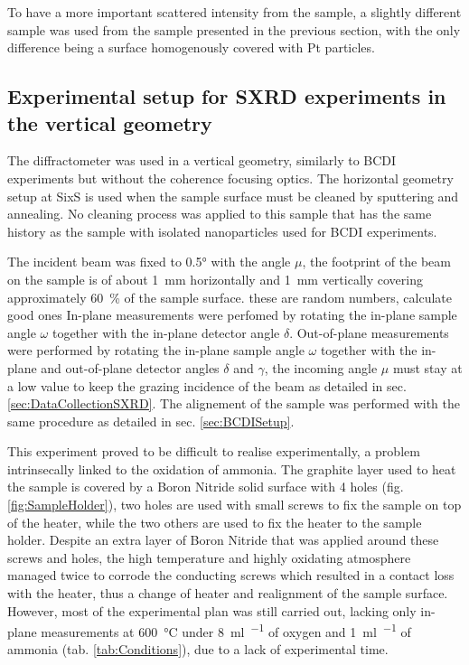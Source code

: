 To have a more important scattered intensity from the sample, a slightly different sample was used from the sample presented in the previous section, with the only difference being a surface homogenously covered with Pt particles.

\subsection{Experimental setup for SXRD experiments in the vertical geometry}\label{sec:SXRDSetupV}

The diffractometer was used in a vertical geometry, similarly to BCDI experiments but without the coherence focusing optics.
The horizontal geometry setup at SixS is used when the sample surface must be cleaned by sputtering and annealing.
No cleaning process was applied to this sample that has the same history as the sample with isolated nanoparticles used for BCDI experiments.

The incident beam was fixed to \ang{0.5} with the angle $\mu$, the footprint of the beam on the sample is of about \qty{1}{\mm} horizontally and \qty{1}{\mm} vertically covering approximately \qty{60}{\percent} of the sample surface.
\textcolor{Important}{these are random numbers, calculate good ones}
In-plane measurements were perfomed by rotating the in-plane sample angle $\omega$ together with the in-plane detector angle $\delta$.
Out-of-plane measurements were performed by rotating the in-plane sample angle $\omega$ together with the in-plane and out-of-plane detector angles $\delta$ and $\gamma$, the incoming angle $\mu$ must stay at a low value to keep the grazing incidence of the beam as detailed in sec. \ref{sec:DataCollectionSXRD}.
The alignement of the sample was performed with the same procedure as detailed in sec. \ref{sec:BCDISetup}.

This experiment proved to be difficult to realise experimentally, a problem intrinsecally linked to the oxidation of ammonia.
The graphite layer used to heat the sample is covered by a Boron Nitride solid surface with 4 holes (fig. \ref{fig:SampleHolder}), two holes are used with small screws to fix the sample on top of the heater, while the two others are used to fix the heater to the sample holder.
Despite an extra layer of Boron Nitride that was applied around these screws and holes, the high temperature and highly oxidating atmosphere managed twice to corrode the conducting screws which resulted in a contact loss with the heater, thus a change of heater and realignment of the sample surface.
However, most of the experimental plan was still carried out, lacking only in-plane measurements at \qty{600}{\degreeCelsius} under \qty{8}{\ml\per\min} of oxygen and \qty{1}{\ml\per\min} of ammonia (tab. \ref{tab:Conditions}), due to a lack of experimental time.

